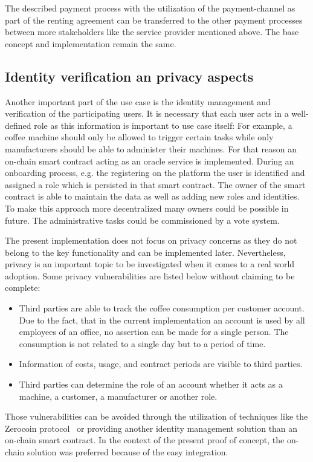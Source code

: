 \documentclass[conference]{IEEEtran}
\begin{document}
The described payment process with the utilization of the payment-channel as part of the renting agreement can be transferred to the other payment processes between more stakeholders like the service provider mentioned above. The base concept and implementation remain the same.

%
\subsection{Identity verification an privacy aspects}

Another important part of the use case is the identity management and verification of the participating users. It is necessary that each user acts in a well-defined role as this information is important to use case itself: For example, a coffee machine should only be allowed to trigger certain tasks while only manufacturers should be able to administer their machines. For that reason an on-chain smart contract acting as an oracle service is implemented. During an onboarding process, e.g. the registering on the platform the user is identified and assigned a role which is persisted in that smart contract. The owner of the smart contract is able to maintain the data as well as adding new roles and identities. To make this approach more decentralized many owners could be possible in future. The administrative tasks could be commissioned by a vote system.

The present implementation does not focus on privacy concerns as they do not belong to the key functionality and can be implemented later. Nevertheless, privacy is an important topic to be investigated when it comes to a real world adoption. Some privacy vulnerabilities are listed below without claiming to be complete:

\begin{itemize}
\item Third parties are able to track the coffee consumption per customer account. Due to the fact, that in the current implementation an account is used by all employees of an office, no assertion can be made for a single person. The consumption is not related to a single day but to a period of time.
\item Information of costs, usage, and contract periods are visible to third parties.
\item Third parties can determine the role of an account whether it acts as a machine, a customer, a manufacturer or another role.
\end{itemize}
Those vulnerabilities can be avoided through the utilization of techniques like the Zerocoin protocol~\cite{zerocoin2013} or providing another identity management solution than an on-chain smart contract. In the context of the present proof of concept, the on-chain solution was preferred because of the easy integration.
\end{document}
